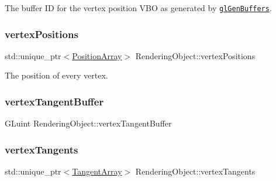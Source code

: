The buffer ID for the vertex position V\+BO as generated by \href{https://www.opengl.org/sdk/docs/man/html/glGenBuffers.xhtml}{\tt gl\+Gen\+Buffers}.

\hypertarget{class_rendering_object_a14721712672d0421ed72a394e3131da0}{}\label{class_rendering_object_a14721712672d0421ed72a394e3131da0}
\subsubsection{\texorpdfstring{vertex\+Positions}{vertexPositions}}
{\footnotesize\ttfamily std\+::unique\+\_\+ptr$<$\hyperlink{class_rendering_object_a1223b9cf03f2029b9c43d71042c2a18e}{Position\+Array}$>$ Rendering\+Object\+::vertex\+Positions\hspace{0.3cm}{\ttfamily [protected]}}



The position of every vertex.

\hypertarget{class_rendering_object_a0eac563be6e35a3cc4409d43a2abaa04}{}\label{class_rendering_object_a0eac563be6e35a3cc4409d43a2abaa04}
\subsubsection{\texorpdfstring{vertex\+Tangent\+Buffer}{vertexTangentBuffer}}
{\footnotesize\ttfamily G\+Luint Rendering\+Object\+::vertex\+Tangent\+Buffer\hspace{0.3cm}{\ttfamily [protected]}}

\hypertarget{class_rendering_object_a7bca44786929dd3aca3d6ca1acc7597f}{}\label{class_rendering_object_a7bca44786929dd3aca3d6ca1acc7597f}
\subsubsection{\texorpdfstring{vertex\+Tangents}{vertexTangents}}
{\footnotesize\ttfamily std\+::unique\+\_\+ptr$<$\hyperlink{class_rendering_object_a45b53e911c2f0131aa10e89869d38944}{Tangent\+Array}$>$ Rendering\+Object\+::vertex\+Tangents\hspace{0.3cm}{\ttfamily [protected]}}


